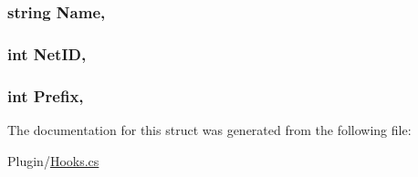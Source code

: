 \subsubsection[{Name}]{\setlength{\rightskip}{0pt plus 5cm}string Name\hspace{0.3cm}{\ttfamily [get]}, {\ttfamily [set]}}\label{structOTA_1_1Plugin_1_1HookArgs_1_1InventoryItemReceived_a7ee9065718e6628dc7791b756fa6c0f9}
\hypertarget{structOTA_1_1Plugin_1_1HookArgs_1_1InventoryItemReceived_a695a967c8b6970a86a81a4b21b2b2666}{}
\subsubsection[{Net\+I\+D}]{\setlength{\rightskip}{0pt plus 5cm}int Net\+I\+D\hspace{0.3cm}{\ttfamily [get]}, {\ttfamily [set]}}\label{structOTA_1_1Plugin_1_1HookArgs_1_1InventoryItemReceived_a695a967c8b6970a86a81a4b21b2b2666}
\hypertarget{structOTA_1_1Plugin_1_1HookArgs_1_1InventoryItemReceived_a4af97a82af468fae09544a1a59762add}{}
\subsubsection[{Prefix}]{\setlength{\rightskip}{0pt plus 5cm}int Prefix\hspace{0.3cm}{\ttfamily [get]}, {\ttfamily [set]}}\label{structOTA_1_1Plugin_1_1HookArgs_1_1InventoryItemReceived_a4af97a82af468fae09544a1a59762add}


The documentation for this struct was generated from the following file\+:\begin{DoxyCompactItemize}
\item 
Plugin/\hyperlink{Hooks_8cs}{Hooks.\+cs}\end{DoxyCompactItemize}
